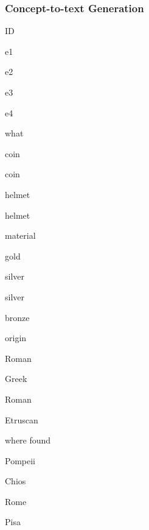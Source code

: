 \documentclass[compress,color=usenames]{beamer}
\begin{document}
\begin{frame}
\frametitle{
Concept-to-text Generation}



ID



e1



e2



e3



e4






what



coin



coin



helmet



helmet






material



gold



silver



silver



bronze






origin



Roman



Greek



Roman



Etruscan






where found



Pompeii



Chios



Rome



Pisa







\end{frame}
\end{document}
